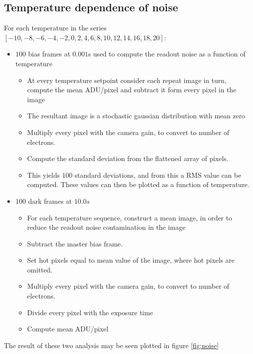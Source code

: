 \documentclass[../main.tex]{subfiles}
\begin{document}
		\subsection{Temperature dependence of noise}\label{sec:rondc}
		For each temperature in the series $[-10, -8, -6, -4, -2, 0, 2, 4, 6, 8, 10, 12, 14, 16, 18, 20]$:
			\begin{itemize}
				\item $100$ bias frames at $0.001$s used to compute the readout noise as a function of temperature
				\begin{itemize}
					\item At every temperature setpoint consider each repeat image in turn, compute the mean ADU/pixel and subtract it form every pixel in the image
					\item The resultant image is a stochastic gaussian distribution with mean zero
					\item Multiply every pixel with the camera gain, to convert to number of electrons.
					\item Compute the standard deviation from the flattened array of pixels.
					\item This yields $100$ standard deviations, and from this a RMS value can be computed. These values can then be plotted as a function of temperature.
				\end{itemize} 
				\item $100$ dark frames at $10.0s$
				\begin{itemize}
					\item For each temperature sequence, construct a mean image, in order to reduce the readout noise contamination in the image
					\item Subtract the master bias frame.
					\item Set hot pixels equal to mean value of the image, where hot pixels are omitted.
					\item Multiply every pixel with the camera gain, to convert to number of electrons.
					\item Divide every pixel with the exposure time
					\item Compute mean ADU/pixel
				\end{itemize}
			\end{itemize}
		The result of these two analysis may be seen plotted in figure \ref{fig:noise}	
		
\end{document}

